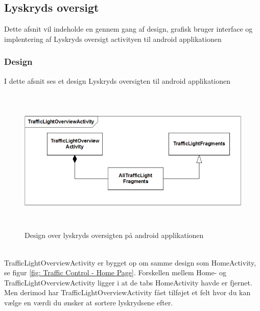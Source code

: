 \subsection{Lyskryds oversigt}
	Dette afsnit vil indeholde en gennem gang af design, grafisk bruger interface og implentering af Lyskryds oversigt activityen til android applikationen
	\subsubsection{Design}
	I dette afsnit ses et design Lyskryds oversigten til android applikationen
	\begin{figure} [!ht]
		\begin{center}
			\includegraphics[height=7cm]{Android/Billeder/Lyskryds}
		\end{center}
		\caption{Design over lyskryds oversigten på android applikationen}
		\label{fig:Design over lyskryds oversigten på android applikationen}
	\end{figure}\\
	TrafficLightOverviewActivity er bygget op om samme design som HomeActivity, se figur \vref{fig: Traffic Control - Home Page}. Forskellen mellem Home- og TrafficLightOverviewActivity ligger i at de tabs HomeActivity havde er fjernet. Men derimod har TrafficLightOverviewActivity fået tilføjet et felt hvor du kan vælge en værdi du ønsker at sortere lyskrydsene efter.
	
	\pagebreak
	
